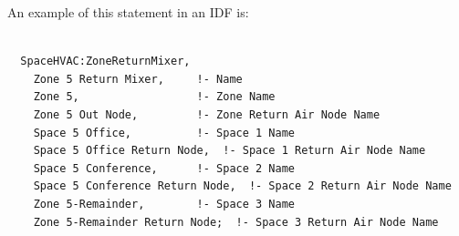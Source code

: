 An example of this statement in an IDF is:

\begin{lstlisting}

  SpaceHVAC:ZoneReturnMixer,
    Zone 5 Return Mixer,     !- Name
    Zone 5,                  !- Zone Name
    Zone 5 Out Node,         !- Zone Return Air Node Name
    Space 5 Office,          !- Space 1 Name
    Space 5 Office Return Node,  !- Space 1 Return Air Node Name
    Space 5 Conference,      !- Space 2 Name
    Space 5 Conference Return Node,  !- Space 2 Return Air Node Name
    Zone 5-Remainder,        !- Space 3 Name
    Zone 5-Remainder Return Node;  !- Space 3 Return Air Node Name
\end{lstlisting}

